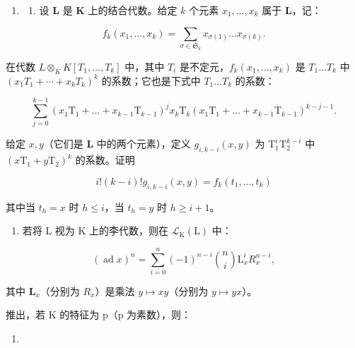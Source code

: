 \begin{enumerate}
\def\labelenumi{\arabic{enumi}.}
\setcounter{enumi}{18}
\tightlist
\item
  \begin{enumerate}
  \def\labelenumii{(\alph{enumii})}
  \tightlist
  \item
    设 \(\mathbf{L}\) 是 \(\mathbf{K}\) 上的结合代数。给定 \(k\) 个元素 \(x_{1},\ldots ,x_{k}\) 属于 \(\mathbf{L}\)，记：
  \end{enumerate}
\end{enumerate}

\[
f _ {k} (x _ {1}, \dots , x _ {k}) = \sum_ {\sigma \in \mathfrak {S}_{k}} x _ {\sigma (1)} \dots x _ {\sigma (k)}.
\]

在代数 \(L \otimes_{K} K[T_{1}, \ldots, T_{k}]\) 中，其中 \(T_{i}\) 是不定元，\(f_{k}(x_{1}, \ldots, x_{k})\) 是 \(T_{1} \ldots T_{k}\) 中 \((x_{1}T_{1} + \cdots + x_{k}T_{k})^{k}\) 的系数；它也是下式中 \(T_{1} \ldots T_{k}\) 的系数：

\[
\sum_ {j = 0} ^ {k - 1} \left(x _ {1} \mathrm{T} _ {1} + \dots + x _ {k - 1} \mathrm{T} _ {k - 1}\right) ^ {j} x _ {k} \mathrm{T} _ {k} \left(x _ {1} \mathrm{T} _ {1} + \dots + x _ {k - 1} \mathrm{T} _ {k - 1}\right) ^ {k - j - 1}.
\]

  给定 \(x, y\)（它们是 \(\mathbf{L}\) 中的两个元素），定义 \(g_{i,k-i}(x,y)\) 为 \(\mathrm{T}_1^i\mathrm{T}_2^{k - i}\) 中 \((x\mathrm{T}_1 + y\mathrm{T}_2)^k\) 的系数。证明

\[
i! (k - i)! g _ {i, k - i} (x, y) = f _ {k} \left(t _ {1}, \dots , t _ {k}\right)
\]

其中当 \(t_h = x\) 时 \(h \leqslant i\)，当 \(t_h = y\) 时 \(h \geqslant i + 1\)。

\begin{enumerate}
\def\labelenumi{(\alph{enumi})}
\setcounter{enumi}{1}
\tightlist
\item
  若将 L 视为 K 上的李代数，则在 \(\mathcal{L}_{\mathrm{K}}(\mathrm{L})\) 中：
\end{enumerate}

\[
(\operatorname{ad} x) ^ {n} = \sum_ {i = 0} ^ {n} (- 1) ^ {n - i} \binom {n} {i} \mathrm{L} _ {x} ^ {i} R _ {x} ^ {n - i},
\]

其中 \(\mathbf{L}_x\)（分别为 \(R_{x}\)）是乘法 \(y\mapsto xy\)（分别为 \(y\mapsto yx\)）。

推出，若 K 的特征为 p（p 为素数），则：

\begin{enumerate}
\def\labelenumi{(\arabic{enumi})}
\tightlist
\item
\end{enumerate}

